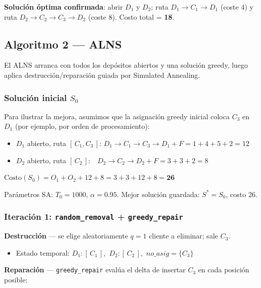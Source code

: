 \documentclass[12pt,a4paper]{article}
\begin{document}
\textbf{Solución óptima confirmada}: abrir $D_1$ y $D_2$;
ruta $D_1\!\to\!C_1\!\to\!D_1$ (coste 4) y ruta $D_2\!\to\!C_2\!\to\!C_3\!\to\!D_2$ (coste 8).
Costo total = \textbf{18}.

\subsection*{Algoritmo 2 — ALNS}

El ALNS arranca con todos los depósitos abiertos y una solución greedy, luego aplica destrucción/reparación guiada por Simulated Annealing.

\subsubsection*{Solución inicial $S_0$}

Para ilustrar la mejora, asumimos que la asignación greedy inicial coloca $C_3$ en $D_1$ (por ejemplo, por orden de procesamiento):

\begin{itemize}[noitemsep]
  \item $D_1$ abierto, ruta $[\,C_1, C_3\,]$: $D_1\!\to\!C_1\!\to\!C_3\!\to\!D_1 + F = 1+4+5+2 = 12$
  \item $D_2$ abierto, ruta $[\,C_2\,]$:\ \ $D_2\!\to\!C_2\!\to\!D_2 + F = 3+3+2 = 8$
\end{itemize}
$\text{Costo}(S_0) = O_1 + O_2 + 12 + 8 = 3+3+12+8 = \mathbf{26}$

Parámetros SA: $T_0=1000$, $\alpha=0.95$. Mejor solución guardada: $S^* = S_0$, costo 26.

\subsubsection*{Iteración 1: \texttt{random\_removal} + \texttt{greedy\_repair}}

\textbf{Destrucción} — se elige aleatoriamente $q=1$ cliente a eliminar; sale $C_3$.
\begin{itemize}[noitemsep]
  \item Estado temporal: $D_1:[\,C_1\,]$,\ $D_2:[\,C_2\,]$,\ $\textit{no\_asig}=\{C_3\}$
\end{itemize}

\textbf{Reparación} — \texttt{greedy\_repair} evalúa el delta de insertar $C_3$ en cada posición posible:
\end{document}
